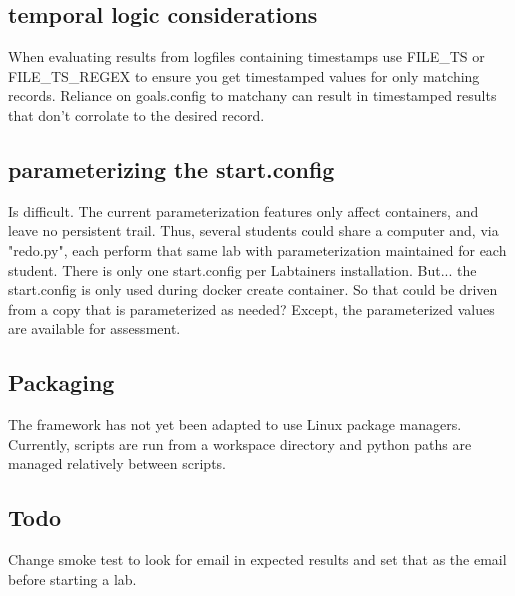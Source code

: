 \documentclass[12pt]{article}
\begin{document}
\subsection {temporal logic considerations}
When evaluating results from logfiles containing timestamps use FILE\_TS or FILE\_TS\_REGEX
to ensure you get timestamped values for only matching records. Reliance on goals.config to
matchany can result in timestamped results that don't corrolate to the desired record. 

\subsection {parameterizing the start.config}
Is difficult.  The current parameterization features only affect containers, and leave no
persistent trail.  Thus, several students could share a computer and, via "redo.py", each 
perform that same lab with parameterization maintained for each student.  There is only one
start.config per Labtainers installation.   But... the start.config is only used during
docker create container.  So that could be driven from a copy that is parameterized as needed?
Except, the parameterized values are available for assessment.

\subsection {Packaging}
The framework has not yet been adapted to use Linux package managers.
Currently, scripts are run from a workspace directory and python
paths are managed relatively between scripts.  

\subsection{Todo}
Change smoke test to look for email in expected results and set that as the email before starting a lab.
\end{document}
